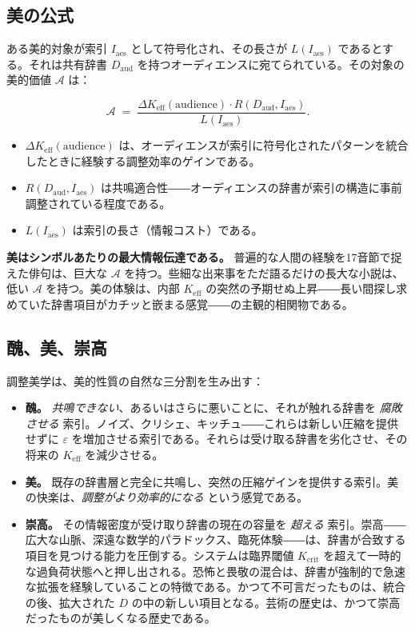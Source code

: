 \documentclass[12pt,a4paper]{article}
\newcommand{\Keff}{K_{\mathrm{eff}}}
\begin{document}
	\subsection{美の公式}
	
	ある美的対象が索引 \(I_{\mathrm{aes}}\) として符号化され、その長さが \(L(I_{\mathrm{aes}})\) であるとする。それは共有辞書 \(D_{\mathrm{aud}}\) を持つオーディエンスに宛てられている。その対象の美的価値 \(\mathcal{A}\) は：
	
	\[
	\mathcal{A} \; = \; \frac{\Delta\Keff(\text{audience}) \cdot R(D_{\mathrm{aud}}, I_{\mathrm{aes}})}{L(I_{\mathrm{aes}})}.
	\]
	
	\begin{itemize}[leftmargin=*]
		\item $\Delta\Keff(\text{audience})$ は、オーディエンスが索引に符号化されたパターンを統合したときに経験する調整効率のゲインである。
		\item $R(D_{\mathrm{aud}}, I_{\mathrm{aes}})$ は共鳴適合性――オーディエンスの辞書が索引の構造に事前調整されている程度である。
		\item $L(I_{\mathrm{aes}})$ は索引の長さ（情報コスト）である。
	\end{itemize}
	
	\textbf{美はシンボルあたりの最大情報伝達である。} 普遍的な人間の経験を17音節で捉えた俳句は、巨大な \(\mathcal{A}\) を持つ。些細な出来事をただ語るだけの長大な小説は、低い \(\mathcal{A}\) を持つ。美の体験は、内部 \(K_{\mathrm{eff}}\) の突然の予期せぬ上昇――長い間探し求めていた辞書項目がカチッと嵌まる感覚――の主観的相関物である。
	
	\subsection{醜、美、崇高}
	
	調整美学は、美的性質の自然な三分割を生み出す：
	
	\begin{itemize}[leftmargin=*]
		\item \textbf{醜。} \emph{共鳴できない}、あるいはさらに悪いことに、それが触れる辞書を \emph{腐敗させる} 索引。ノイズ、クリシェ、キッチュ――これらは新しい圧縮を提供せずに \(\varepsilon\) を増加させる索引である。それらは受け取る辞書を劣化させ、その将来の \(K_{\mathrm{eff}}\) を減少させる。
		\item \textbf{美。} 既存の辞書層と完全に共鳴し、突然の圧縮ゲインを提供する索引。美の快楽は、\emph{調整がより効率的になる} という感覚である。
		\item \textbf{崇高。} その情報密度が受け取り辞書の現在の容量を \emph{超える} 索引。崇高――広大な山脈、深遠な数学的パラドックス、臨死体験――は、辞書が合致する項目を見つける能力を圧倒する。システムは臨界閾値 \(K_{\mathrm{crit}}\) を超えて一時的な過負荷状態へと押し出される。恐怖と畏敬の混合は、辞書が強制的で急速な拡張を経験していることの特徴である。かつて不可言だったものは、統合の後、拡大された \(D\) の中の新しい項目となる。芸術の歴史は、かつて崇高だったものが美しくなる歴史である。
	\end{itemize}
	
\end{document}
